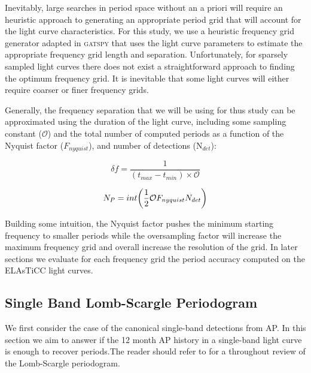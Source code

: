 \documentclass[DM,authoryear,toc]{lsstdoc}
\begin{document}
Inevitably, large searches in period space without an a priori will require an heuristic approach to generating an appropriate period grid that will account for the light curve characteristics.
For this study, we use a heuristic frequency grid generator adapted in \textsc{gatspy} that uses the light curve parameters to estimate the appropriate frequency grid length and separation.
Unfortunately, for sparsely sampled light curves there does not exist a straightforward approach to finding the optimum frequency grid.
It is inevitable that some light curves will either require coarser or finer frequency grids.

Generally, the frequency separation that we will be using for thus study can be approximated using the duration of the light curve, including some sampling constant ($\mathcal{O}$) and the total number of computed periods as a function of the Nyquist factor ($F_{nyquist}$), and number of detections (N$_{det}$): 

\begin{equation}
\delta f = \frac{1}{(t_{max} - t_{min}) \times \mathcal{O}}
\end{equation}

\begin{equation}
N_{P} = int \bigg{(} \frac{1}{2} \mathcal{O} F_{nyquist} N_{det} \bigg{)}
\end{equation}

Building some intuition, the Nyquist factor pushes the minimum starting frequency to smaller periods while the oversampling factor will increase the maximum frequency grid and overall increase the resolution of the grid. In later sections we evaluate for each frequency grid the period accuracy computed on the ELAsTiCC light curves.

\subsection{Single Band Lomb-Scargle Periodogram}
We first consider the case of the canonical single-band detections from AP. In this section we aim to answer if the 12 month AP history in a single-band light curve is enough to recover periods.The reader should refer to \citet{VanderPlas:VP2015} for a throughout review of the Lomb-Scargle periodogram.
  
\end{document}
